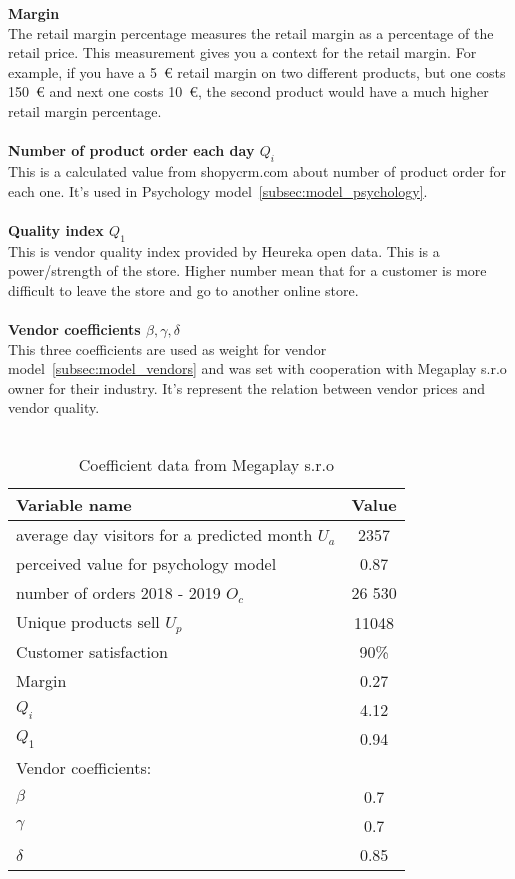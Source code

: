 \textbf{Margin}\\
The retail margin percentage measures the retail margin as a percentage of the retail price.
This measurement gives you a context for the retail margin.
For example, if you have a 5~€ retail margin on two different products, but one costs 150~€ and next one costs 10~€, the second product would have a much higher retail margin percentage.\\
\\
\textbf{Number of product order each day $Q_i$}\\
This is a calculated value from shopycrm.com about number of product order for each one.
It's used in Psychology model~\ref{subsec:model_psychology}. \\
\\
\textbf{Quality index $Q_1$}\\
This is vendor quality index provided by Heureka open data.
This is a power/strength of the store.
Higher number mean that for a customer is more difficult to leave the store and go to another online store.\\
\\
\textbf{Vendor coefficients $\beta, \gamma, \delta$} \label{vendorCoeff}\\
This three coefficients are used as weight for vendor model~\ref{subsec:model_vendors} and was set with cooperation with Megaplay s.r.o owner for their industry.
It's represent the relation between vendor prices and vendor quality.\\
\\
\begin{table}[h!]
    \begin{center}
        \begin{tabular}{ | l | c |}
            \hline
            {\textbf{Variable name}} & \textbf{Value}\\
            \hline
            average day visitors for a predicted month $U_a$& 2357 \\
            perceived value for psychology model & 0.87 \\
            number of orders 2018 - 2019 $O_c$ & 26 530 \\
            Unique products sell $U_p$ & 11048\\
            Customer satisfaction & 90\%\\
            Margin & 0.27\\
            $Q_i$ & 4.12\\
            $Q_1$ & 0.94\\
            Vendor coefficients: & \\
            $\beta$ & 0.7\\
            $\gamma$ & 0.7\\
            $\delta$ & 0.85\\
            \hline
        \end{tabular}
    \end{center}
    \caption{Coefficient data from Megaplay s.r.o}
    \label{megaplay_data}
\end{table}
